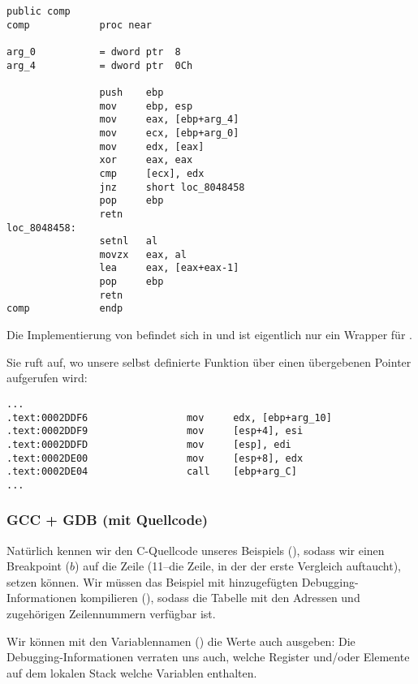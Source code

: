 \begin{lstlisting}[style=customasmx86]
                public comp
comp            proc near

arg_0           = dword ptr  8
arg_4           = dword ptr  0Ch

                push    ebp
                mov     ebp, esp
                mov     eax, [ebp+arg_4]
                mov     ecx, [ebp+arg_0]
                mov     edx, [eax]
                xor     eax, eax
                cmp     [ecx], edx
                jnz     short loc_8048458
                pop     ebp
                retn
loc_8048458:
                setnl   al
                movzx   eax, al
                lea     eax, [eax+eax-1]
                pop     ebp
                retn
comp            endp
\end{lstlisting}

Die Implementierung von \qsort befindet sich in  und ist eigentlich nur ein Wrapper für .

Sie ruft  auf, wo unsere selbst definierte Funktion über einen übergebenen Pointer aufgerufen wird:

\begin{lstlisting}[caption=(file libc.so.6{,} glibc version---2.10.1),style=customasmx86]
...
.text:0002DDF6                 mov     edx, [ebp+arg_10]
.text:0002DDF9                 mov     [esp+4], esi
.text:0002DDFD                 mov     [esp], edi
.text:0002DE00                 mov     [esp+8], edx
.text:0002DE04                 call    [ebp+arg_C]
...
\end{lstlisting}

\subsubsection{GCC + GDB (mit Quellcode)}
Natürlich kennen wir den C-Quellcode unseres Beispiels (), sodass wir einen Breakpoint ($b$) auf die
Zeile (11--die Zeile, in der der erste Vergleich auftaucht), setzen können.
Wir müssen das Beispiel mit hinzugefügten Debugging-Informationen kompilieren (), sodass die Tabelle mit den
Adressen und zugehörigen Zeilennummern verfügbar ist.

Wir können mit den Variablennamen () die Werte auch ausgeben:
Die Debugging-Informationen verraten uns auch, welche Register und/oder Elemente auf dem lokalen Stack welche Variablen
enthalten.

